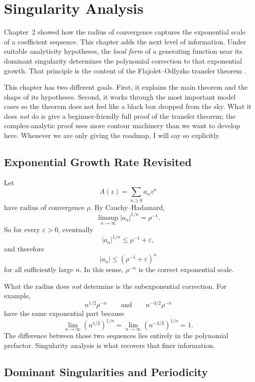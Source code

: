 \chapter{Singularity Analysis}
\label{ch04:top}

Chapter~2 showed how the radius of convergence captures the exponential scale of a coefficient sequence. This chapter adds the next level of information. Under suitable analyticity hypotheses, the \emph{local form} of a generating function near its dominant singularity determines the polynomial correction to that exponential growth. That principle is the content of the Flajolet--Odlyzko transfer theorem \cite{FlajoletOdlyzko1990}.

This chapter has two different goals. First, it explains the main theorem and the shape of its hypotheses. Second, it works through the most important model cases so the theorem does not feel like a black box dropped from the sky. What it does \emph{not} do is give a beginner-friendly full proof of the transfer theorem; the complex-analytic proof uses more contour machinery than we want to develop here. Whenever we are only giving the roadmap, I will say so explicitly.

\section{Exponential Growth Rate Revisited}

Let
\[
  A(z) = \sum_{n \ge 0} a_n z^n
\]
have radius of convergence $\rho$. By Cauchy--Hadamard,
\[
  \limsup_{n \to \infty} |a_n|^{1/n} = \rho^{-1}.
\]
So for every $\varepsilon > 0$, eventually
\[
  |a_n|^{1/n} \le \rho^{-1} + \varepsilon,
\]
and therefore
\[
  |a_n| \le (\rho^{-1}+\varepsilon)^n
\]
for all sufficiently large $n$. In this sense, $\rho^{-n}$ is the correct exponential scale.

What the radius does \emph{not} determine is the subexponential correction. For example,
\[
  n^{1/2}\rho^{-n}
  \qquad\text{and}\qquad
  n^{-3/2}\rho^{-n}
\]
have the same exponential part because
\[
  \lim_{n \to \infty} (n^{1/2})^{1/n} = \lim_{n \to \infty} (n^{-3/2})^{1/n} = 1.
\]
The difference between those two sequences lies entirely in the polynomial prefactor. Singularity analysis is what recovers that finer information.

\section{Dominant Singularities and Periodicity}

